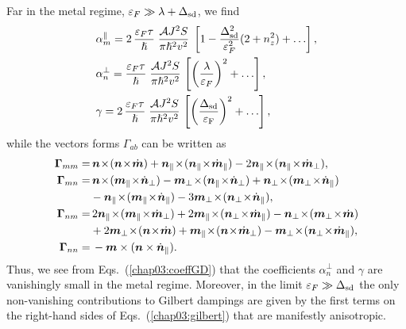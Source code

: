 Far in the metal regime, $\varepsilon_F\gg \lambda+\Delta_{\text{sd}}$, we find
\beml
\label{chap03:coeffGD}
\begin{align}
&\alpha_m^\parallel= 2\,\frac{\ep_F\tau}{\hslash}\;\frac{\mathcal{A} J^2 S}{\pi\hslash^2v^2}\; \lt[1-\frac{\Delta_{\text{sd}}^2}{\ep_F^2}(2+n^2_z) + \dots\rt],\\
&\alpha_n^\perp = \frac{\ep_F\tau}{\hslash}\;\frac{\mathcal{A} J^2 S}{\pi\hslash^2v^2} \,\lt[\lt(\frac{\lambda}{\ep_F}\rt)^2+\dots\rt],\\
&\gamma= 2\,\frac{\ep_F\tau}{\hslash}\;\frac{\mathcal{A} J^2 S}{\pi\hslash^2v^2}\,\lt[\lt(\frac{\Delta_{\text{sd}}}{\ep_\textrm{F}}\rt)^2+\dots\rt],
\end{align}
\eml
while the vectors forms $\Gamma_{ab}$ can be written as
\beml
\begin{align}
\bb{\Gamma}_{mm}=&\,
\bb{n}\!\times\!(\bb{n}\!\times\!\dot{\bb{m}}) + \bb{n}_\parallel\!\times\!(\bb{n}_\parallel\!\times\!\dot{\bb{m}}_\parallel)  
- 2 \bb{n}_\parallel\!\times\!(\bb{n}_\parallel\!\times\!\dot{\bb{m}}_\perp),\\
\bb{\Gamma}_{mn}=&\,
\bb{n}\!\times\!(\bb{m}_\parallel\!\times\!\dot{\bb{n}}_\perp) 
- \bb{m}_\perp\!\times\!(\bb{n}_\parallel\!\times\!\dot{\bb{n}}_\perp)
+\bb{n}_\perp\!\times\!(\bb{m}_\perp\!\times\!\dot{\bb{n}}_\parallel) \n\\
&- \bb{n}_\parallel\!\times\!(\bb{m}_\parallel\!\times\!\dot{\bb{n}}_\parallel)
- 3\bb{m}_\perp\!\times\!(\bb{n}_\perp\!\times\!\dot{\bb{n}}_\parallel),\\
\bb{\Gamma}_{nm}=&\,2\bb{n}_\parallel\!\times\!(\bb{m}_\parallel\!\times\!\dot{\bb{m}}_\perp)+ 
2\bb{m}_\parallel\!\times\!(\bb{n}_\perp\!\times\!\dot{\bb{m}}_\parallel)
-\bb{n}_\perp\!\times\!(\bb{m}_\perp\!\times\!\dot{\bb{m}})\n\\
&+2 \bb{m}_\perp\!\times\!(\bb{n}\!\times\!\dot{\bb{m}})
+ \bb{m}_\parallel\!\times\!(\bb{n}\!\times\!\dot{\bb{m}}_\perp) 
- \bb{m}_\perp\!\times\!(\bb{n}_\perp\!\times\!\dot{\bb{m}}_\parallel),\\
\bb{\Gamma}_{nn}=&\,-\bb{m}\times(\bb{n}\times\dot{\bb{n}}_\parallel).
\end{align}
\eml
Thus, we see from Eqs.~(\ref{chap03:coeffGD}) that the coefficients $\alpha_n^{\perp}$ and $\gamma$ are vanishingly small in the metal regime. Moreover, in the limit $\varepsilon_F\gg \Delta_{\text{sd}}$ the only non-vanishing contributions to Gilbert dampings are given by the first terms on the right-hand sides of Eqs.~(\ref{chap03:gilbert}) that are manifestly anisotropic.


